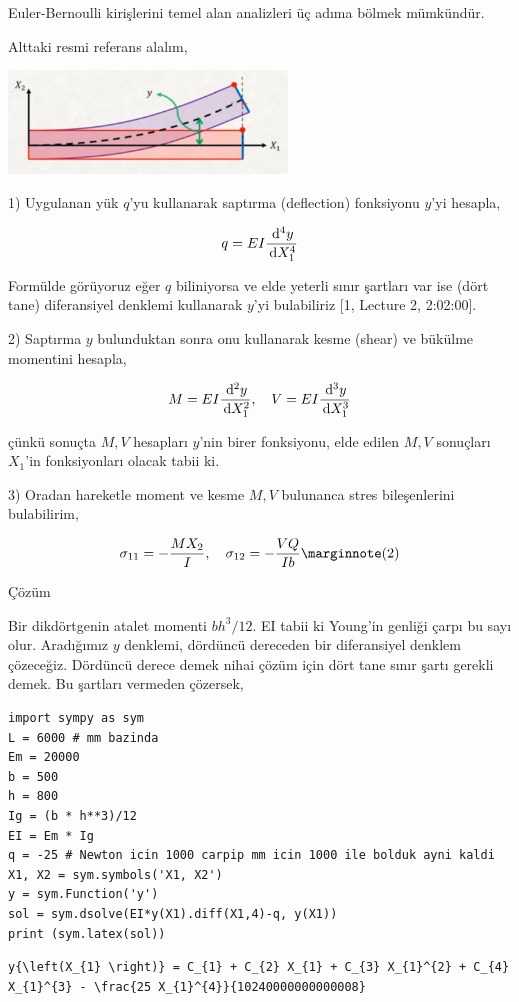 \documentclass[12pt,fleqn]{article}\usepackage{../../common}
\begin{document}
Euler-Bernoulli kirişlerini temel alan analizleri üç adıma bölmek mümkündür.

Alttaki resmi referans alalım,

\includegraphics[width=20em]{phy_020_strs_06_01.jpg}

1) Uygulanan yük $q$'yu kullanarak saptırma (deflection) fonksiyonu $y$'yi hesapla,

$$
q = E I \frac{\,\mathrm{d}^4 y}{\,\mathrm{d} X_1^4}
$$

Formülde görüyoruz eğer $q$ biliniyorsa ve elde yeterli sınır şartları var ise
(dört tane) diferansiyel denklemi kullanarak $y$'yi bulabiliriz
[1, Lecture 2, 2:02:00]. 

2) Saptırma $y$ bulunduktan sonra onu kullanarak kesme (shear) ve bükülme
momentini hesapla,

$$
M = E I \frac{\,\mathrm{d}^2 y}{\,\mathrm{d} X_1^2}, \quad
V = E I \frac{\,\mathrm{d}^3 y}{\,\mathrm{d} X_1^3} 
$$

çünkü sonuçta $M,V$ hesapları $y$'nin birer fonksiyonu, elde edilen $M,V$
sonuçları $X_1$'in fonksiyonları olacak tabii ki.

3) Oradan hareketle moment ve kesme $M,V$ bulunanca stres bileşenlerini
bulabilirim,

$$
\sigma_{11} = -\frac{M X_2}{I}, \quad
\sigma_{12} = -\frac{VQ}{I b}
\mlabel{2}
$$

Çözüm

Bir dikdörtgenin atalet momenti $b h^3 / 12$. EI tabii ki Young'in genliği çarpı
bu sayı olur. Aradığımız $y$ denklemi, dördüncü dereceden bir diferansiyel
denklem çözeceğiz. Dördüncü derece demek nihai çözüm için dört tane sınır
şartı gerekli demek. Bu şartları vermeden çözersek,

\begin{verbatim}
import sympy as sym
L = 6000 # mm bazinda
Em = 20000
b = 500
h = 800
Ig = (b * h**3)/12
EI = Em * Ig
q = -25 # Newton icin 1000 carpip mm icin 1000 ile bolduk ayni kaldi
X1, X2 = sym.symbols('X1, X2')
y = sym.Function('y')
sol = sym.dsolve(EI*y(X1).diff(X1,4)-q, y(X1))
print (sym.latex(sol))
\end{verbatim}

\begin{verbatim}
y{\left(X_{1} \right)} = C_{1} + C_{2} X_{1} + C_{3} X_{1}^{2} + C_{4} X_{1}^{3} - \frac{25 X_{1}^{4}}{10240000000000008}
\end{verbatim}
\end{document}
